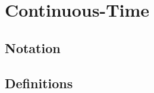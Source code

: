 \documentclass[11pt,a4paper]{article}
\begin{document}
%
%
%
%
%
%

%
%
%
%
%
%
%
%

\section{Continuous-Time}\label{sec_continuous_time_models}


\subsection{Notation}

\subsection{Definitions}
\end{document}
